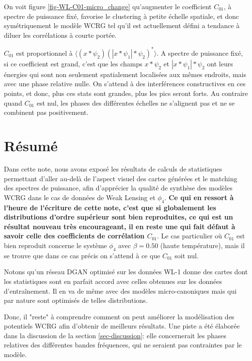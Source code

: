 \documentclass[12pt,twoside]{article}
\begin{document}
On voit figure \ref{fig-WL-C01-micro_change} qu'augmenter le coefficient $C_{01}$, à spectre de puissance fixé, favorise le clustering à petite échelle spatiale, et donc symétriquement le modèle WCRG tel qu'il est actuellement défini a tendance à diluer les corrélations à courte portée. 

$C_{01}$ est proportionnel à  $\langle(x \ast \psi_2)(|x \ast \psi_1| \ast \psi_2)^\ast\rangle$.
A spectre de puissance fixé, si ce coefficient est grand, c'est que les champs $x \ast \psi_2$ et $|x\ast \psi_1| \ast \psi_2$ ont  leurs énergies qui sont  non seulement spatialement localisées aux mêmes endroits, mais avec une phase relative nulle. On s'attend à des interférences constructives en ces points, et donc, plus ces stats sont grandes, plus les pics seront forts. Au contraire quand $C_{01}$ est nul, les phases des différentes échelles ne s'alignent pas et ne se combinent pas positivement. 

%
\section{Résumé}
% 
Dans cette note, nous avons exposé les résultats de calculs de statistiques permettant d'aller au-delà de l'aspect visuel des cartes générées et le matching des spectres de puissance, afin d'apprécier la qualité de synthèse des modèles WCRG dans le cas de données de Weak Lensing et $\phi_4$. \textbf{Ce qui en ressort à l'heure de l'écriture de cette note, c'est que si globalement les distributions d'ordre supérieur sont bien reproduites, ce qui est un résultat nouveau très encourageant, il en reste une qui fait défaut à savoir celle des coefficients de corrélation $C_{01}$}.  Le cas particulier où $C_{01}$ est bien reproduit concerne le système $\phi_4$ avec $\beta=0.50$ (haute température), mais il se trouve que dans ce cas précis on s'attend à ce que $C_{01}$ soit nul.

Notons qu'un réseau DGAN optimisé sur les données WL-1 donne des cartes dont les statistiques sont en parfait accord avec celles obtenues sur les données d'entraînement. Il en va de même avec des modèles micro-canoniques mais qui par nature sont optimisés de telles distributions.

Donc, il "reste" à comprendre comment on peut améliorer la modélisation des potentiels WCRG afin d'obtenir de meilleurs résultats. Une piste a été élaborée dans la discussion de la section \ref{sec-discussion}: elle concernerait les phases relatives des différentes bandes fréquences, qui ne seraient pas contraintes par le modèle.
\end{document}
